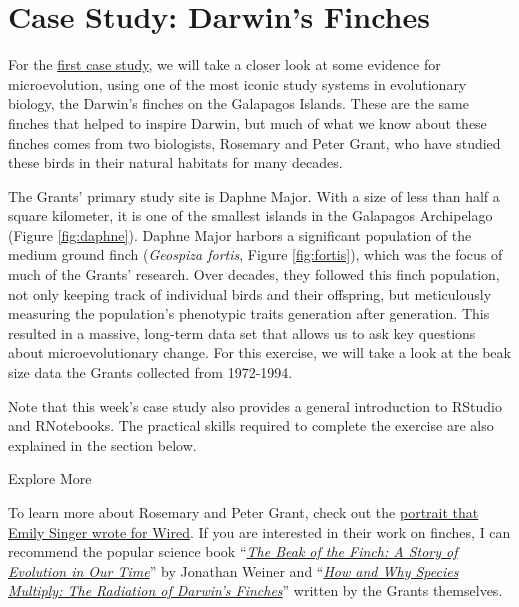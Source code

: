 \documentclass[
]{book}
\begin{document}
\hypertarget{case-study-darwins-finches}{%
\section{Case Study: Darwin's Finches}\label{case-study-darwins-finches}}

For the \href{exercises/BIOL520-ex1.zip}{first case study}, we will take a closer look at some evidence for microevolution, using one of the most iconic study systems in evolutionary biology, the Darwin's finches on the Galapagos Islands. These are the same finches that helped to inspire Darwin, but much of what we know about these finches comes from two biologists, Rosemary and Peter Grant, who have studied these birds in their natural habitats for many decades.

The Grants' primary study site is Daphne Major. With a size of less than half a square kilometer, it is one of the smallest islands in the Galapagos Archipelago (Figure \ref{fig:daphne}). Daphne Major harbors a significant population of the medium ground finch (\emph{Geospiza fortis}, Figure \ref{fig:fortis}), which was the focus of much of the Grants' research. Over decades, they followed this finch population, not only keeping track of individual birds and their offspring, but meticulously measuring the population's phenotypic traits generation after generation. This resulted in a massive, long-term data set that allows us to ask key questions about microevolutionary change. For this exercise, we will take a look at the beak size data the Grants collected from 1972-1994.

Note that this week's case study also provides a general introduction to RStudio and RNotebooks. The practical skills required to complete the exercise are also explained in the section below.

Explore More

To learn more about Rosemary and Peter Grant, check out the \href{https://www.wired.com/2016/10/legendary-biologists-clocked-evolutions-astonishing-speed/}{portrait that Emily Singer wrote for Wired}. If you are interested in their work on finches, I can recommend the popular science book ``\href{https://www.amazon.com/Beak-Finch-Story-Evolution-Time/dp/067973337X}{\emph{The Beak of the Finch: A Story of Evolution in Our Time}}'' by Jonathan Weiner and ``\href{https://www.amazon.com/How-Why-Species-Multiply-Evolutionary/dp/0691149992}{\emph{How and Why Species Multiply: The Radiation of Darwin's Finches}}'' written by the Grants themselves.
\end{document}
